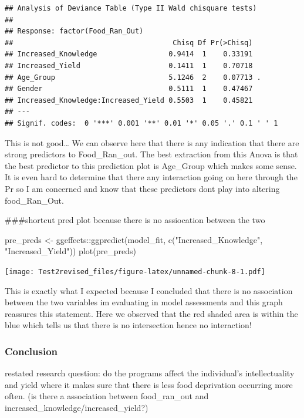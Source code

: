 \documentclass[
]{article}
\newenvironment{Shaded}{\begin{snugshade}}{\end{snugshade}}
\newcommand{\FunctionTok}[1]{\textcolor[rgb]{0.00,0.00,0.00}{#1}}
\newcommand{\NormalTok}[1]{#1}
\newcommand{\OtherTok}[1]{\textcolor[rgb]{0.56,0.35,0.01}{#1}}
\newcommand{\SpecialCharTok}[1]{\textcolor[rgb]{0.00,0.00,0.00}{#1}}
\newcommand{\StringTok}[1]{\textcolor[rgb]{0.31,0.60,0.02}{#1}}
\begin{document}
\begin{verbatim}
## Analysis of Deviance Table (Type II Wald chisquare tests)
## 
## Response: factor(Food_Ran_Out)
##                                      Chisq Df Pr(>Chisq)  
## Increased_Knowledge                 0.9414  1    0.33191  
## Increased_Yield                     0.1411  1    0.70718  
## Age_Group                           5.1246  2    0.07713 .
## Gender                              0.5111  1    0.47467  
## Increased_Knowledge:Increased_Yield 0.5503  1    0.45821  
## ---
## Signif. codes:  0 '***' 0.001 '**' 0.01 '*' 0.05 '.' 0.1 ' ' 1
\end{verbatim}

This is not good\ldots{} We can observe here that there is any
indication that there are strong predictors to Food\_Ran\_out. The best
extraction from this Anova is that the best predictor to this prediction
plot is Age\_Group which makes some sense. It is even hard to determine
that there any interaction going on here through the Pr so I am
concerned and know that these predictors dont play into altering
food\_Ran\_Out.

\#\#\#shortcut pred plot because there is no assiocation between the two

\begin{Shaded}
\begin{Highlighting}[]
\NormalTok{pre\_preds }\OtherTok{\textless{}{-}}\NormalTok{ ggeffects}\SpecialCharTok{::}\FunctionTok{ggpredict}\NormalTok{(model\_fit, }\FunctionTok{c}\NormalTok{(}\StringTok{"Increased\_Knowledge"}\NormalTok{, }\StringTok{"Increased\_Yield"}\NormalTok{))}
\FunctionTok{plot}\NormalTok{(pre\_preds)}
\end{Highlighting}
\end{Shaded}

\texttt{[image: Test2revised\_files/figure-latex/unnamed-chunk-8-1.pdf]}

This is exactly what I expected because I concluded that there is no
association between the two variables im evaluating in model assessments
and this graph reassures this statement. Here we observed that the red
shaded area is within the blue which tells us that there is no
intersection hence no interaction!

\hypertarget{conclusion}{%
\subsubsection{Conclusion}\label{conclusion}}

restated research question: do the programs affect the individual's
intellectuality and yield where it makes sure that there is less food
deprivation occurring more often. (is there a association between
food\_ran\_out and increased\_knowledge/increased\_yield?)
\end{document}
